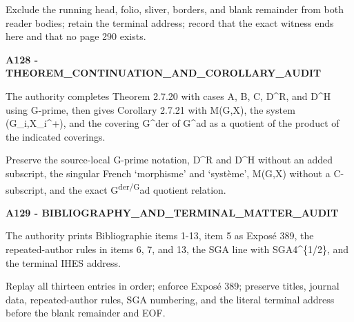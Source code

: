 \documentclass[10pt,a4paper]{article}
\begin{document}
Exclude the running head, folio, sliver, borders, and blank remainder from both reader bodies; retain the terminal address; record that the exact witness ends here and that no page 290 exists.

\textbf{A128 - THEOREM\_CONTINUATION\_AND\_COROLLARY\_AUDIT}

The authority completes Theorem 2.7.20 with cases A, B, C, D\^{}R, and D\^{}H using G-prime, then gives Corollary 2.7.21 with M(G,X), the system (G\_i,X\_i\^{}+), and the covering G\^{}der of G\^{}ad as a quotient of the product of the indicated coverings.

Preserve the source-local G-prime notation, D\^{}R and D\^{}H without an added subscript, the singular French `morphisme' and `système', M(G,X) without a C-subscript, and the exact G\textsuperscript{der/G}ad quotient relation.

\textbf{A129 - BIBLIOGRAPHY\_AND\_TERMINAL\_MATTER\_AUDIT}

The authority prints Bibliographie items 1-13, item 5 as Exposé 389, the repeated-author rules in items 6, 7, and 13, the SGA line with SGA4\^{}\{1/2\}, and the terminal IHES address.

Replay all thirteen entries in order; enforce Exposé 389; preserve titles, journal data, repeated-author rules, SGA numbering, and the literal terminal address before the blank remainder and EOF.
\end{document}
